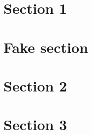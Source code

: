 \newcommand{\unitName}{Unit name}
\newcommand{\unitTime}{Semester 1, 2022}
\newcommand{\unitCoordinator}{John Smith}

\usepackage[
    type={CC},
    modifier={by-nc-sa},
    version={4.0},
    imagewidth={5em},
    hyphenation={raggedright}
]{doclicense}

\section{Section 1}
\section*{Fake section}
\section{Section 2}
\section{Section 3}